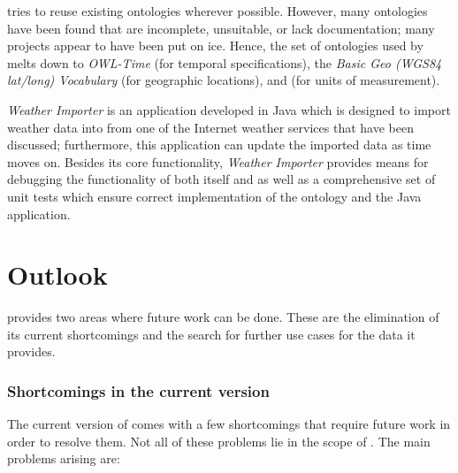\smarthomeweather tries to reuse existing ontologies wherever possible. However, many ontologies have been found that are incomplete, unsuitable, or lack documentation; many projects appear to have been put on ice. Hence, the set of ontologies used by \smarthomeweather melts down to \emph{OWL-Time} (for temporal specifications), the \emph{Basic Geo (\acs{WGS84} lat/long) Vocabulary} (for geographic locations), and \muo (for units of measurement).

\emph{Weather Importer} is an application developed in Java which is designed to import weather data into \smarthomeweather from one of the Internet weather services that have been discussed; furthermore, this application can update the imported data as time moves on. Besides its core functionality, \emph{Weather Importer} provides means for debugging the functionality of both itself and \smarthomeweather as well as a comprehensive set of unit tests which ensure correct implementation of the ontology and the Java application.

\section{Outlook}

\smarthomeweather provides two areas where future work can be done. These are the elimination of its current shortcomings and the search for further use cases for the data it provides.

\subsubsection{Shortcomings in the current version}

The current version of \smarthomeweather comes with a few shortcomings that require future work in order to resolve them. Not all of these problems lie in the scope of \smarthomeweather. The main problems arising are:

